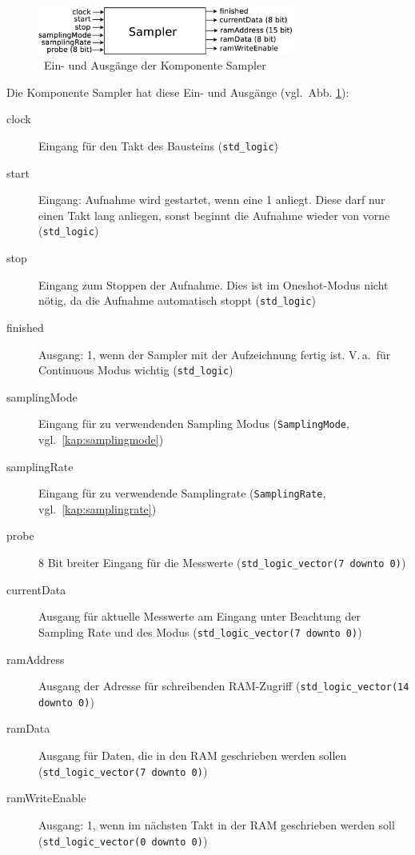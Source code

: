 \documentclass[IN,ngerman,utf8,12pt]{tumbook}
\newcommand{\vgl}{vgl.\ }
\newcommand{\Va}{V.\,a.\ }
\begin{document}
\begin{figure}[H]
    \centerline{
        \includegraphics[width=0.75\textwidth]{img/sampler}
    }
    \label{abb:sampler}
    \caption{\ Ein- und Ausgänge der Komponente Sampler}
\end{figure}

Die Komponente Sampler hat diese Ein- und Ausgänge (\vgl Abb. \ref{abb:sampler}):
\begin{description}
    \item[clock] Eingang für den Takt des Bausteins (\texttt{std\_logic})
    \item[start] Eingang: Aufnahme wird gestartet, wenn eine 1 anliegt. Diese darf nur einen Takt lang anliegen, sonst beginnt die Aufnahme wieder von vorne (\texttt{std\_logic})
    \item[stop] Eingang zum Stoppen der Aufnahme. Dies ist im Oneshot-Modus nicht nötig, da die Aufnahme automatisch stoppt (\texttt{std\_logic})
    \item[finished] Ausgang: 1, wenn der Sampler mit der Aufzeichnung fertig ist. \Va für Continuous Modus wichtig (\texttt{std\_logic})
    \item[samplingMode] Eingang für zu verwendenden Sampling Modus (\texttt{SamplingMode}, \vgl \ref{kap:samplingmode})
    \item[samplingRate] Eingang für zu verwendende Samplingrate (\texttt{SamplingRate}, \vgl \ref{kap:samplingrate})
    \item[probe] 8 Bit breiter Eingang für die Messwerte (\texttt{std\_logic\_vector(7 downto 0)})
    \item[currentData] Ausgang für aktuelle Messwerte am Eingang unter Beachtung der Sampling Rate und des Modus (\texttt{std\_logic\_vector(7 downto 0)})
    \item[ramAddress] Ausgang der Adresse für schreibenden RAM-Zugriff (\texttt{std\_logic\_vector(14 downto 0)})
    \item[ramData] Ausgang für Daten, die in den RAM geschrieben werden sollen \\
        (\texttt{std\_logic\_vector(7 downto 0)})
    \item[ramWriteEnable] Ausgang: 1, wenn im nächsten Takt in der RAM geschrieben werden soll (\texttt{std\_logic\_vector(0 downto 0)})
\end{description}
\end{document}
